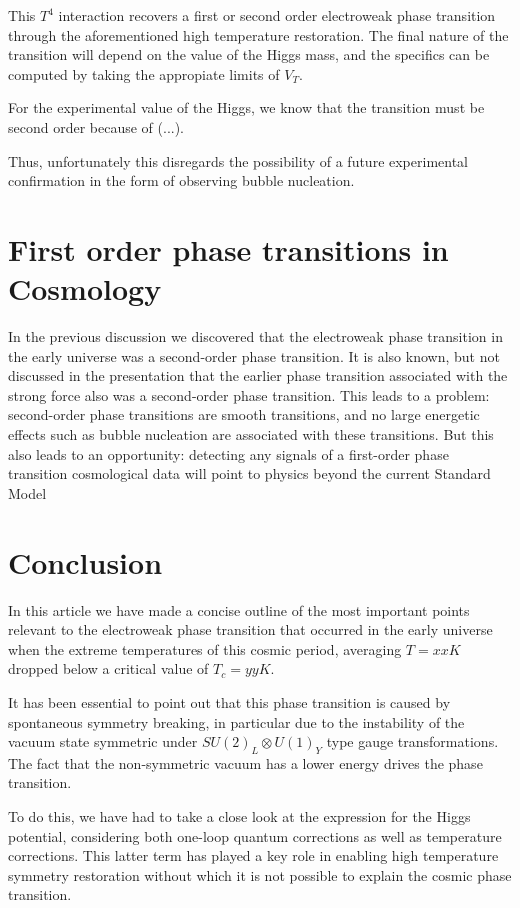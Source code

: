 \documentclass{article}
\numberwithin{equation}{section}
\begin{document}
This $T^4$ interaction recovers a first or second order electroweak phase transition through the aforementioned high temperature restoration. The final nature of the transition will depend on the value of the Higgs mass, and the specifics can be computed by taking the appropiate limits of $V_T$.

For the experimental value of the Higgs, we know that the transition must be second order because of (...).

Thus, unfortunately this disregards the possibility of a future experimental confirmation in the form of observing bubble nucleation.



\section{First order phase transitions in Cosmology}
In the previous discussion we discovered that the electroweak phase transition in the early universe was a second-order phase transition.
It is also known, but not discussed in the presentation that the earlier phase transition associated with the strong force also was a second-order
phase transition. This leads to a problem: second-order phase transitions are smooth transitions, and no large energetic effects such as bubble 
nucleation are associated with these transitions. But this also leads to an opportunity: detecting any signals of a first-order phase transition 
cosmological data will point to physics beyond the current Standard Model

\section{Conclusion} %
In this article we have made a concise outline of the most important points relevant to the electroweak phase transition that occurred in the early universe when the extreme temperatures of this cosmic period, averaging $T = xxK$ dropped below a critical value of $T_c=yyK$.

It has been essential to point out that this phase transition is caused by spontaneous symmetry breaking, in particular due to the instability of the vacuum state symmetric under $SU(2)_L \otimes U(1)_Y$ type gauge transformations. The fact that the non-symmetric vacuum has a lower energy drives the phase transition.

To do this, we have had to take a close look at the expression for the Higgs potential, considering both one-loop quantum corrections as well as temperature corrections. This latter term has played a key role in enabling high temperature symmetry restoration without which it is not possible to explain the cosmic phase transition.
\end{document}
